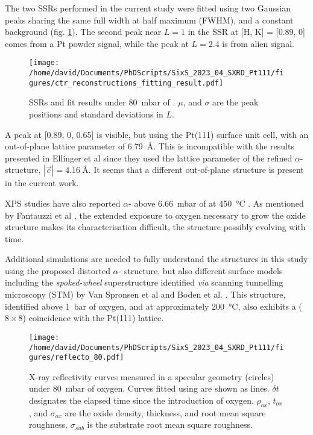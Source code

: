 The two SSRs performed in the current study were fitted using two Gaussian peaks sharing the same full width at half maximum (FWHM), and a constant background (fig. \ref{fig:LScans80Fit}).
The second peak near $L=1$ in the SSR at [H, K] = [0.89, 0] comes from a Pt powder signal, while the peak at $L=2.4$ is from alien signal.

\begin{figure}[!htb]
    \centering
    \texttt{[image: /home/david/Documents/PhDScripts/SixS\_2023\_04\_SXRD\_Pt111/figures/ctr\_reconstructions\_fitting\_result.pdf]}
    \caption{
        SSRs and fit results under \qty{80}{\milli\bar} of .
        $\mu$, and $\sigma$ are the peak positions and standard deviations in $L$.
    }
    \label{fig:LScans80Fit}
\end{figure}

A peak at [0.89, 0, 0.65] is visible, but using the Pt(111) surface unit cell, with an out-of-plane lattice parameter of \qty{6.79}{\angstrom}.
This is incompatible with the results presented in Ellinger et al \parencite*{Ellinger2008} since they used the lattice parameter of the refined $\alpha$- structure, $|\vec{c}|=\qty{4.16}{\angstrom}$.
It seems that a different out-of-plane structure is present in the current work.

XPS studies have also reported $\alpha$- above \qty{6.66}{\milli\bar} of  at \qty{450}{\degreeCelsius} \parencite{Miller2011, Miller2014}.
As mentioned by Fantauzzi et al \parencite*{Fantauzzi2017}, the extended exposure to oxygen necessary to grow the oxide structure makes its characterisation difficult, the structure possibly evolving with time.

Additional simulations are needed to fully understand the structures in this study using the proposed distorted $\alpha$- structure, but also different surface models including the \textit{spoked-wheel} superstructure identified \textit{via} scanning tunnelling microscopy (STM) by Van Spronsen et al \parencite*{VanSpronsen2017} and Boden et al. \parencite*{Boden2022}.
This structure, identified above \qty{1}{\bar} of oxygen, and at approximately \qty{200}{\degreeCelsius}, also exhibits a ($8\times8$) coincidence with the Pt(111) lattice.

\begin{figure}[!htb]
    \centering
    \texttt{[image: /home/david/Documents/PhDScripts/SixS\_2023\_04\_SXRD\_Pt111/figures/reflecto\_80.pdf]}
    \caption{
    	X-ray reflectivity curves measured in a specular geometry (circles) under \qty{80}{\milli\bar} of oxygen.
    	Curves fitted using  are shown as lines.
        $\delta t$ designates the elapsed time since the introduction of oxygen.
        $\rho_{ox}$, $t_{ox}$, and $\sigma_{ox}$ are the oxide density, thickness, and root mean square roughness.
        $\sigma_{sub}$ is the substrate root mean square roughness.
    }
    \label{fig:Reflecto80}
\end{figure}

